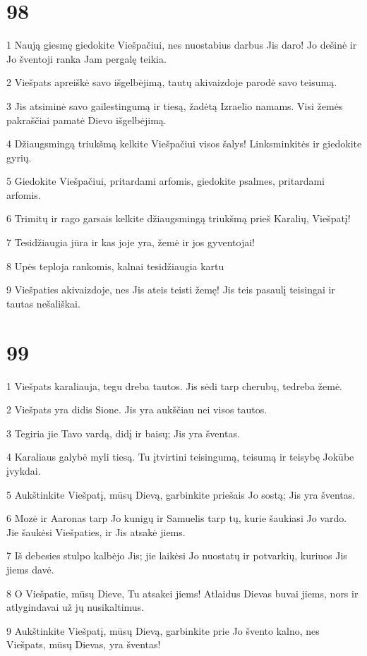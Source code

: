 \chapter{98}


\par 1 Naują giesmę giedokite Viešpačiui, nes nuostabius darbus Jis daro! Jo dešinė ir Jo šventoji ranka Jam pergalę teikia. 
\par 2 Viešpats apreiškė savo išgelbėjimą, tautų akivaizdoje parodė savo teisumą. 
\par 3 Jis atsiminė savo gailestingumą ir tiesą, žadėtą Izraelio namams. Visi žemės pakraščiai pamatė Dievo išgelbėjimą. 
\par 4 Džiaugsmingą triukšmą kelkite Viešpačiui visos šalys! Linksminkitės ir giedokite gyrių. 
\par 5 Giedokite Viešpačiui, pritardami arfomis, giedokite psalmes, pritardami arfomis. 
\par 6 Trimitų ir rago garsais kelkite džiaugsmingą triukšmą prieš Karalių, Viešpatį! 
\par 7 Tesidžiaugia jūra ir kas joje yra, žemė ir jos gyventojai! 
\par 8 Upės teploja rankomis, kalnai tesidžiaugia kartu 
\par 9 Viešpaties akivaizdoje, nes Jis ateis teisti žemę! Jis teis pasaulį teisingai ir tautas nešališkai.


\chapter{99}


\par 1 Viešpats karaliauja, tegu dreba tautos. Jis sėdi tarp cherubų, tedreba žemė. 
\par 2 Viešpats yra didis Sione. Jis yra aukščiau nei visos tautos. 
\par 3 Tegiria jie Tavo vardą, didį ir baisų; Jis yra šventas. 
\par 4 Karaliaus galybė myli tiesą. Tu įtvirtini teisingumą, teisumą ir teisybę Jokūbe įvykdai. 
\par 5 Aukštinkite Viešpatį, mūsų Dievą, garbinkite priešais Jo sostą; Jis yra šventas. 
\par 6 Mozė ir Aaronas tarp Jo kunigų ir Samuelis tarp tų, kurie šaukiasi Jo vardo. Jie šaukėsi Viešpaties, ir Jis atsakė jiems. 
\par 7 Iš debesies stulpo kalbėjo Jis; jie laikėsi Jo nuostatų ir potvarkių, kuriuos Jis jiems davė. 
\par 8 O Viešpatie, mūsų Dieve, Tu atsakei jiems! Atlaidus Dievas buvai jiems, nors ir atlygindavai už jų nusikaltimus. 
\par 9 Aukštinkite Viešpatį, mūsų Dievą, garbinkite prie Jo švento kalno, nes Viešpats, mūsų Dievas, yra šventas!


